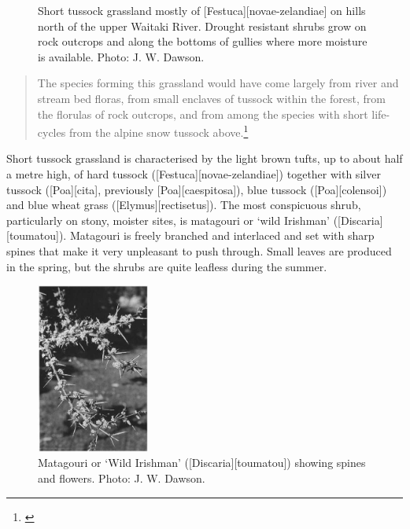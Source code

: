 \begin{figure}[htb]
\begin{minipage}[t]{0.343\textwidth}
    	\caption[Short tussock grassland mostly of \emph{Festuca novae-zelandiae}]{Short tussock grassland mostly of [Festuca][novae-zelandiae] on hills north of the upper Waitaki River.
    	Drought resistant shrubs grow on rock outcrops and along the bottoms of gullies where more moisture is available.  Photo:  J. W. Dawson.}%
    	\label{fig:82short-tussock}
	\end{minipage}
\end{figure}

\begin{quote}
	The species forming this grassland would have come largely from river and stream bed floras, from small enclaves of tussock within the forest, from the florulas of rock outcrops, and from among the species with short life-cycles from the alpine snow tussock above.\footnote{\cite{connor1969montane}}
\end{quote}

Short tussock grassland is characterised by the light brown tufts, up to about half a metre high, of hard tussock ([Festuca][novae-zelandiae]) together with silver tussock ([Poa][cita], previously [Poa][caespitosa]), blue tussock ([Poa][colensoi]) and blue wheat grass ([Elymus][rectisetus]).
The most conspicuous shrub, particularly on stony, moister sites, is matagouri or `wild Irishman' ([Discaria][toumatou]).
Matagouri is freely branched and interlaced and set with sharp spines that make it very unpleasant to push through.
Small leaves are produced in the spring, but the shrubs are quite leafless during the summer.

\begin{figure}
	\includegraphics[width=0.33\textwidth]{graphics/figure83matagouri.jpg}
	\centering
	\caption[Matagouri]{Matagouri or `Wild Irishman' ([Discaria][toumatou]) showing spines and flowers.
	Photo:  J. W. Dawson.}%
	\label{fig:83matagouri}
\end{figure}

